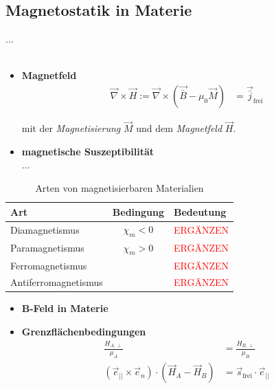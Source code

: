 \documentclass{article}
\begin{document}
\newpage


\subsection{Magnetostatik in Materie}
...\\
\\
	\begin{itemize}
		\item \textbf{Magnetfeld}
			\begin{align}
				\vec{\nabla} \times \vec{H} := \vec{\nabla} \times (\vec{\bar{B}} - \mu_0 \vec{M}) &= \vec{\bar{j}}_\text{frei}
			\end{align}
		
		mit der \textit{Magnetisierung} $\vec{M}$ und dem \textit{Magnetfeld} $\vec{H}$.
		
		
		\item \textbf{magnetische Suszeptibilität}\\
		...
	\end{itemize}
	

	\begin{table}[H]
		\centering
		\caption{Arten von magnetisierbaren Materialien}
		\begin{tabular}{l|c|l}
			\hline\hline
				Art & Bedingung & Bedeutung \\
			\hline
				Diamagnetismus & $\chi_m < 0$ & \textcolor{red}{ERGÄNZEN} \\
			\hline
				Paramagnetismus & $\chi_m > 0$ & \textcolor{red}{ERGÄNZEN} \\
			\hline
				Ferromagnetismus & & \textcolor{red}{ERGÄNZEN} \\
			\hline
				Antiferromagnetismus & & \textcolor{red}{ERGÄNZEN} \\
			\hline\hline
		\end{tabular}
	\end{table}


	\begin{itemize}
		\item \textbf{B-Feld in Materie}


		\item \textbf{Grenzflächenbedingungen}
			\begin{align}
				\frac{H_{A,\perp}}{\mu_A} &= \frac{H_{B,\perp}}{\mu_B} \\
				(\vec{e}_{||} \times \vec{e}_n) \cdot (\vec{H}_A - \vec{H}_B) &= \vec{s}_\text{frei} \cdot \vec{e}_{||}
			\end{align}
	\end{itemize}
\end{document}
